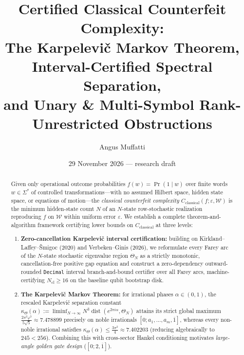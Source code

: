 \documentclass[11pt]{article}
\title{Certified Classical Counterfeit Complexity:\\
The Karpelevi\v{c} Markov Theorem, Interval-Certified Spectral Separation,\\
and Unary \& Multi-Symbol Rank-Unrestricted Obstructions}
\author{Angus Muffatti}
\date{29 November 2026 --- research draft}
\theoremstyle{definition}
\newcommand{\eps}{\varepsilon}
\newcommand{\dist}{\operatorname{dist}}
\begin{document}
\maketitle

\begin{abstract}
Given only operational outcome probabilities $f(w)=\Pr(1\mid w)$ over finite words $w\in\Sigma^*$ of controlled transformations---with no assumed Hilbert space, hidden state space, or equations of motion---the \emph{classical counterfeit complexity} $C_{\mathrm{classical}}(f;\eps,\mathcal{W})$ is the minimum hidden-state count $N$ of an $N$-state row-stochastic realization reproducing $f$ on $\mathcal{W}$ within uniform error $\eps$.
We establish a complete theorem-and-algorithm framework certifying lower bounds on $C_{\mathrm{classical}}$ at three levels:
\begin{enumerate}
\item \textbf{Zero-cancellation Karpelevi\v{c} interval certification:} building on Kirkland--Laffey--\v{S}migoc (2020) and Verbeken--Ginis (2026), we reformulate every Farey arc of the $N$-state stochastic eigenvalue region $\Theta_N$ as a strictly monotonic, cancellation-free positive gap equation and construct a zero-dependency outward-rounded \texttt{Decimal} interval branch-and-bound certifier over all Farey arcs, machine-certifying $N_{\mathrm{cl}}\ge 16$ on the baseline qubit bootstrap disk.
\item \textbf{The Karpelevi\v{c} Markov Theorem:} for irrational phases $\alpha\in(0,1)$, the rescaled Karpelevi\v{c} separation constant $\kappa_\Theta(\alpha):=\liminf_{N\to\infty} N^3\dist(e^{2\pi i\alpha},\Theta_N)$ attains its strict global maximum $\frac{2\pi^2\varphi^3}{5\sqrt{5}}\approx 7.478899$ precisely on noble irrationals $[0;a_1,\dots,a_m,\overline{1}]$, whereas every non-noble irrational satisfies $\kappa_\Theta(\alpha)\le \frac{3\pi^2}{4}\approx 7.402203$ (reducing algebraically to $245<256$). Combining this with cross-sector Hankel conditioning motivates \emph{large-angle golden gate design} ($[0;2,\overline{1}]$).

\end{enumerate}
\end{abstract}
\end{document}
